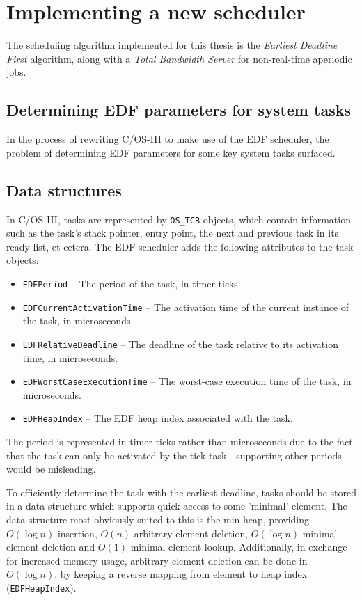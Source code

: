 \documentclass[twoside]{uva-inf-bachelor-thesis}
\newcommand{\code}[1]{\lstinline{#1}}
\newcommand{\ucosiii}{\textmu C/OS-III\xspace}
\begin{document}
\chapter{Implementing a new scheduler}
The scheduling algorithm implemented for this thesis is the \emph{Earliest Deadline First} algorithm, along with a \emph{Total Bandwidth Server} for non-real-time aperiodic jobs.

\section{Determining EDF parameters for system tasks}
In the process of rewriting \ucosiii to make use of the EDF scheduler, the problem of determining EDF parameters for some key system tasks surfaced.

\section{Data structures}
In \ucosiii, tasks are represented by \code{OS_TCB} objects, which contain information such as the task's stack pointer, entry point, the next and previous task in its ready list, et cetera. The EDF scheduler adds the following attributes to the task objects:

\begin{itemize}
    \item \code{EDFPeriod} -- The period of the task, in timer ticks.
    \item \code{EDFCurrentActivationTime} -- The activation time of the current instance of the task, in microseconds.
    \item \code{EDFRelativeDeadline} -- The deadline of the task relative to its activation time, in microseconds.
    \item \code{EDFWorstCaseExecutionTime} -- The worst-case execution time of the task, in microseconds.
    \item \code{EDFHeapIndex} -- The EDF heap index associated with the task.
\end{itemize}

The period is represented in timer ticks rather than microseconds due to the fact that the task can only be activated by the tick task - supporting other periods would be misleading.

To efficiently determine the task with the earliest deadline, tasks should be stored in a data structure which supports quick access to some 'minimal' element. The data structure most obviously suited to this is the min-heap, providing $O(\log n)$ insertion, $O(n)$ arbitrary element deletion, $O(\log n)$ minimal element deletion and $O(1)$ minimal element lookup. Additionally, in exchange for increased memory usage, arbitrary element deletion can be done in $O(\log n)$, by keeping a reverse mapping from element to heap index (\code{EDFHeapIndex}).
\end{document}
